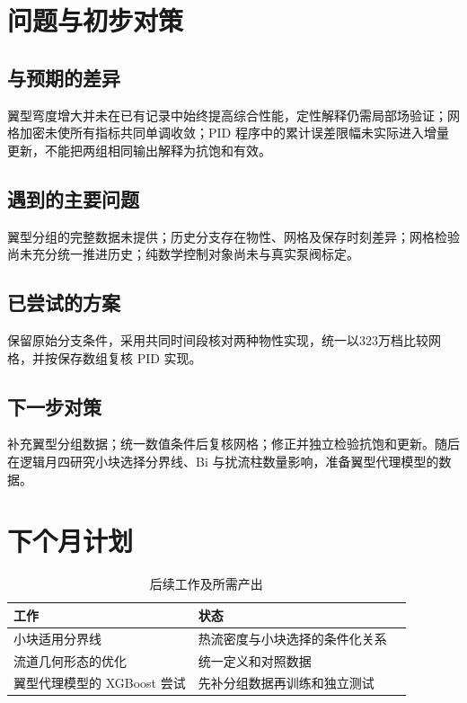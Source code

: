 \documentclass[stage2,fontset=fandol]{ydzjreport}
\begin{document}
\section{问题与初步对策}

\subsection{与预期的差异}

翼型弯度增大并未在已有记录中始终提高综合性能，定性解释仍需局部场验证；网格加密未使所有指标共同单调收敛；PID 程序中的累计误差限幅未实际进入增量更新，不能把两组相同输出解释为抗饱和有效。



\subsection{遇到的主要问题}

翼型分组的完整数据未提供；历史分支存在物性、网格及保存时刻差异；网格检验尚未充分统一推进历史；纯数学控制对象尚未与真实泵阀标定。

\subsection{已尝试的方案}

保留原始分支条件，采用共同时间段核对两种物性实现，统一以323万档比较网格，并按保存数组复核 PID 实现。

\subsection{下一步对策}

补充翼型分组数据；统一数值条件后复核网格；修正并独立检验抗饱和更新。随后在逻辑月四研究小块选择分界线、Bi 与扰流柱数量影响，准备翼型代理模型的数据。

\section{下个月计划}

\begin{table}[H]\centering
\caption{后续工作及所需产出}\label{tab:plan}
\begin{tabularx}{\textwidth}{@{}Y Y Y@{}}
\toprule
{} 工作 & 状态  \\
\midrule
小块适用分界线 & 热流密度与小块选择的条件化关系 \\
流道几何形态的优化 & 统一定义和对照数据  \\
翼型代理模型的 XGBoost 尝试 & 先补分组数据再训练和独立测试  \\
\bottomrule\end{tabularx}\end{table}
\end{document}
